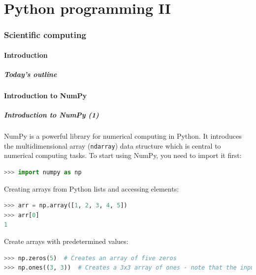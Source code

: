 \part{Python programming II}
\section{Scientific computing}
\subsection{Introduction}
\begin{frame}[label=contents_prog2]
  \frametitle{Today's outline}
\end{frame}

\subsection{Introduction to NumPy}
\begin{frame}[fragile]
  \frametitle{Introduction to NumPy (1)}
  NumPy is a powerful library for numerical computing in Python. It introduces the multidimensional array (\lstinline|ndarray|) data structure which is central to numerical computing tasks. To start using NumPy, you need to import it first:
  \begin{lstlisting}[language=Python, numbers=none]
>>> import numpy as np
  \end{lstlisting}\pause
  Creating arrays from Python lists and accessing elements:
  \begin{lstlisting}[language=Python, numbers=none]
>>> arr = np.array([1, 2, 3, 4, 5])
>>> arr[0]
1
  \end{lstlisting}\pause
  Create arrays with predetermined values:
  \begin{lstlisting}[language=Python, numbers=none]
>>> np.zeros(5)  # Creates an array of five zeros
>>> np.ones((3, 3))  # Creates a 3x3 array of ones - note that the input argument is a tuple
  \end{lstlisting}
\end{frame}

